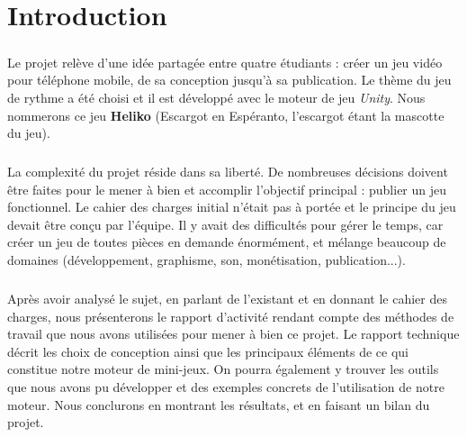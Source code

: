 \chapter{Introduction}

\paragraph{}
Le projet relève d'une idée partagée entre quatre étudiants : créer un jeu vidéo pour téléphone mobile, de sa conception jusqu'à sa publication. Le thème du jeu de rythme a été choisi et il est développé avec le moteur de jeu \textit{Unity}. Nous nommerons ce jeu \textbf{Heliko} (Escargot en Espéranto, l'escargot étant la mascotte du jeu).

\paragraph{}
La complexité du projet réside dans sa liberté. De nombreuses décisions doivent être faites pour le mener à bien et accomplir l'objectif principal : publier un jeu fonctionnel. Le cahier des charges initial n'était pas à portée et le principe du jeu devait être conçu par l'équipe. Il y avait des difficultés pour gérer le temps, car créer un jeu de toutes pièces en demande énormément, et mélange beaucoup de domaines (développement, graphisme, son, monétisation, publication...).

\paragraph{}
Après avoir analysé le sujet, en parlant de l'existant et en donnant le cahier des charges, nous présenterons le rapport d'activité rendant compte des méthodes de travail que nous avons utilisées pour mener à bien ce projet. Le rapport technique décrit les choix de conception ainsi que les principaux éléments de ce qui constitue notre moteur de mini-jeux. On pourra également y trouver les outils que nous avons pu développer et des exemples concrets de l'utilisation de notre moteur. Nous conclurons en montrant les résultats, et en faisant un bilan du projet.
